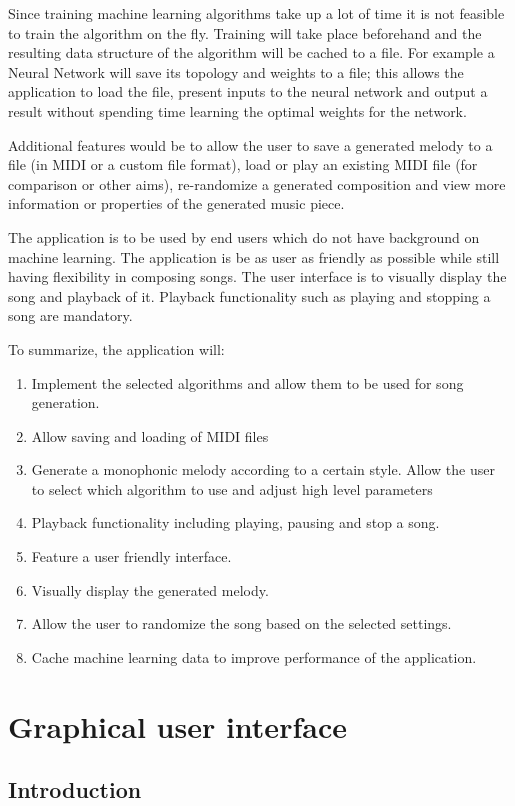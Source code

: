 Since training machine learning algorithms take up a lot of time it is not feasible to train the algorithm on the fly. Training will take place beforehand and the resulting data structure of the algorithm will be cached to a file. 
For example a Neural Network will save its topology and weights to a file; this allows the application to load the file, present inputs to the neural network and output a result without spending time learning the optimal weights for the network.

Additional features would be to allow the user to save a generated melody to a file (in \ac{MIDI} or a custom file format), load or play an existing \ac{MIDI} file (for comparison or other aims), re-randomize a generated composition and view more information or properties of the generated music piece.

The application is to be used by end users which do not have background on machine learning. The application is be as user as friendly as possible while still having flexibility in composing songs. The user interface is to visually display the song and playback of it. Playback functionality such as playing and stopping a song are mandatory.

To summarize, the application will:
\begin{enumerate}
\item Implement the selected algorithms and allow them to be used for song generation.
\item Allow saving and loading of \ac{MIDI} files
\item Generate a monophonic melody according to a certain style. Allow the user to select which algorithm to use and adjust high level parameters
\item Playback functionality including playing, pausing and stop a song. 
\item Feature a user friendly interface.
\item Visually display the generated melody.
\item Allow the user to randomize the song based on the selected settings.
\item Cache machine learning data to improve performance of the application.
\end{enumerate}

\chapter{Graphical user interface}

\section{Introduction}

